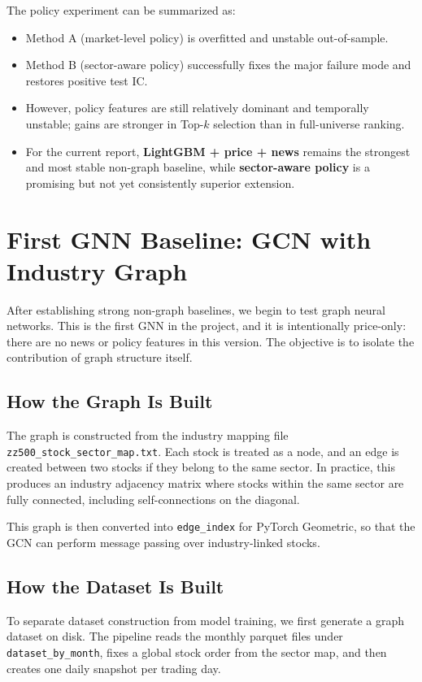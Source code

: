 The policy experiment can be summarized as:
\begin{itemize}
\item Method A (market-level policy) is overfitted and unstable out-of-sample.
\item Method B (sector-aware policy) successfully fixes the major failure mode and restores positive test IC.
\item However, policy features are still relatively dominant and temporally unstable; gains are stronger in Top-$k$ selection than in full-universe ranking.
\item For the current report, \textbf{LightGBM + price + news} remains the strongest and most stable non-graph baseline, while \textbf{sector-aware policy} is a promising but not yet consistently superior extension.
\end{itemize}

\section{First GNN Baseline: GCN with Industry Graph}

After establishing strong non-graph baselines, we begin to test graph neural networks. This is the first GNN in the project, and it is intentionally price-only: there are no news or policy features in this version. The objective is to isolate the contribution of graph structure itself.

\subsection{How the Graph Is Built}

The graph is constructed from the industry mapping file \texttt{zz500\_stock\_sector\_map.txt}. Each stock is treated as a node, and an edge is created between two stocks if they belong to the same sector. In practice, this produces an industry adjacency matrix where stocks within the same sector are fully connected, including self-connections on the diagonal.

This graph is then converted into \texttt{edge\_index} for PyTorch Geometric, so that the GCN can perform message passing over industry-linked stocks.

\subsection{How the Dataset Is Built}

To separate dataset construction from model training, we first generate a graph dataset on disk. The pipeline reads the monthly parquet files under \texttt{dataset\_by\_month}, fixes a global stock order from the sector map, and then creates one daily snapshot per trading day.

